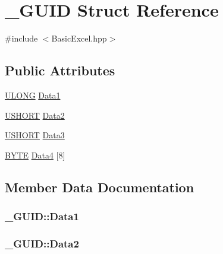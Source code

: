 \hypertarget{struct___g_u_i_d}{}\section{\+\_\+\+G\+U\+I\+D Struct Reference}
\label{struct___g_u_i_d}


{\ttfamily \#include $<$Basic\+Excel.\+hpp$>$}

\subsection*{Public Attributes}
\begin{DoxyCompactItemize}
\item 
\hyperlink{_basic_excel_8hpp_abe09d1bea023be6a07cbadde8e955435}{U\+L\+O\+N\+G} \hyperlink{struct___g_u_i_d_aa8a03f06ed2af52a5aadeac367ffafea}{Data1}
\item 
\hyperlink{_basic_excel_8hpp_a5850d5316caf7f4cedd742fdf8cd7c02}{U\+S\+H\+O\+R\+T} \hyperlink{struct___g_u_i_d_aa9eb86ef3c0b45d892d249f94eb91c7e}{Data2}
\item 
\hyperlink{_basic_excel_8hpp_a5850d5316caf7f4cedd742fdf8cd7c02}{U\+S\+H\+O\+R\+T} \hyperlink{struct___g_u_i_d_a763787bcc60573c8d61bb4db4ba98a10}{Data3}
\item 
\hyperlink{_basic_excel_8hpp_a4ae1dab0fb4b072a66584546209e7d58}{B\+Y\+T\+E} \hyperlink{struct___g_u_i_d_ac58e12d266b867e4f7a4bb52e2476abd}{Data4} \mbox{[}8\mbox{]}
\end{DoxyCompactItemize}


\subsection{Member Data Documentation}
\hypertarget{struct___g_u_i_d_aa8a03f06ed2af52a5aadeac367ffafea}{}
\subsubsection[{Data1}]{ \+\_\+\+G\+U\+I\+D\+::\+Data1}\label{struct___g_u_i_d_aa8a03f06ed2af52a5aadeac367ffafea}
\hypertarget{struct___g_u_i_d_aa9eb86ef3c0b45d892d249f94eb91c7e}{}
\subsubsection[{Data2}]{ \+\_\+\+G\+U\+I\+D\+::\+Data2}\label{struct___g_u_i_d_aa9eb86ef3c0b45d892d249f94eb91c7e}
\hypertarget{struct___g_u_i_d_a763787bcc60573c8d61bb4db4ba98a10}{}
